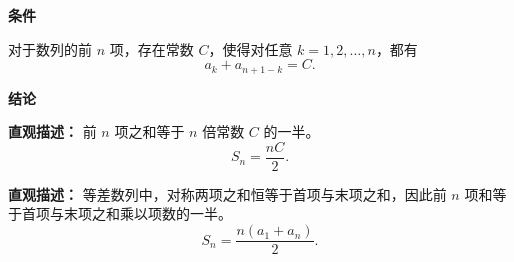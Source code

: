 \begin{statementbox}
	\textbf{\textcolor{CStatement}{条件}}
	\begin{description}[style=nextline, leftmargin=2.8em, labelsep=0.5em, itemsep=0.35em]
		\item[\textbf{\textcolor{CStatement}{条件1（前 \(n\) 项对称等和）：}}]
		      对于数列的前 \(n\) 项，存在常数 \(C\)，使得对任意
		      \(k=1,2,\dots,n\)，都有
		      \[
			      a_k+a_{n+1-k}=C.
		      \]
	\end{description}

	\textbf{\textcolor{CStatement}{结论}}
	\begin{description}[style=nextline, leftmargin=2.8em, labelsep=0.5em, itemsep=0.45em]
		\item[\textbf{\textcolor{CStatement}{结论一（倒序求和公式）：}}]
		      \textbf{\textcolor{CStatement}{直观描述：}}
		      前 \(n\) 项之和等于 \(n\) 倍常数 \(C\) 的一半。
		      \[
			      S_n=\frac{nC}{2}.
		      \]

		\item[\textbf{\textcolor{CStatement}{推广结论（等差数列特例）：}}]
		      \textbf{\textcolor{CStatement}{直观描述：}}
		      等差数列中，对称两项之和恒等于首项与末项之和，因此前 \(n\) 项和等于首项与末项之和乘以项数的一半。
		      \[
			      \boxed{S_n=\frac{n(a_1+a_n)}{2}}.
		      \]
	\end{description}
\end{statementbox}